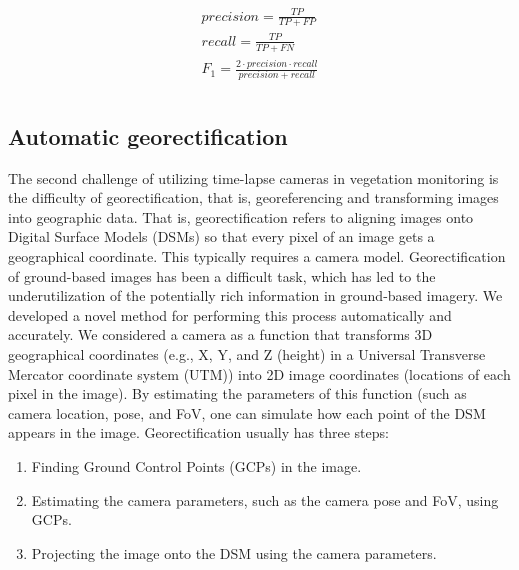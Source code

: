 \documentclass{article}
\providecommand{\tightlist}{%
  \setlength{\itemsep}{0pt}\setlength{\parskip}{0pt}}
\begin{document}
\label{f1score}
\begin{align}
\label{metrics}
  \begin{gathered}
  precision = \frac{TP}{TP + FP} \\
  recall = \frac{TP}{TP + FN} \\
  F_1 = \frac{2 \cdot precision \cdot recall}{precision + recall} \\
  \end{gathered}
\end{align}

\hypertarget{automatic-georectification}{%
\subsection{Automatic georectification}\label{automatic-georectification}}

The second challenge of utilizing time-lapse cameras in vegetation monitoring is the difficulty of georectification, that is, georeferencing and transforming images into geographic data. That is, georectification refers to aligning images onto Digital Surface Models (DSMs) so that every pixel of an image gets a geographical coordinate. This typically requires a camera model. Georectification of ground-based images has been a difficult task, which has led to the underutilization of the potentially rich information in ground-based imagery. We developed a novel method for performing this process automatically and accurately. We considered a camera as a function that transforms 3D geographical coordinates (e.g., X, Y, and Z (height) in a Universal Transverse Mercator coordinate system (UTM)) into 2D image coordinates (locations of each pixel in the image). By estimating the parameters of this function (such as camera location, pose, and FoV, one can simulate how each point of the DSM appears in the image. Georectification usually has three steps:

\begin{enumerate}
\def\labelenumi{\arabic{enumi}.}
\tightlist
\item
  Finding Ground Control Points (GCPs) in the image.
\item
  Estimating the camera parameters, such as the camera pose and FoV, using GCPs.
\item
  Projecting the image onto the DSM using the camera parameters.
\end{enumerate}
\end{document}
